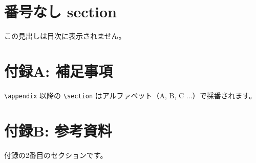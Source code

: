 \documentclass[lualatex,ja=standard]{bxjsarticle}
\begin{document}
\section*{番号なし section}

この見出しは目次に表示されません。

\appendix

\section{付録A: 補足事項}

\texttt{\textbackslash appendix} 以降の \texttt{\textbackslash section}
はアルファベット（A, B, C ...）で採番されます。

\section{付録B: 参考資料}

付録の2番目のセクションです。
\end{document}
